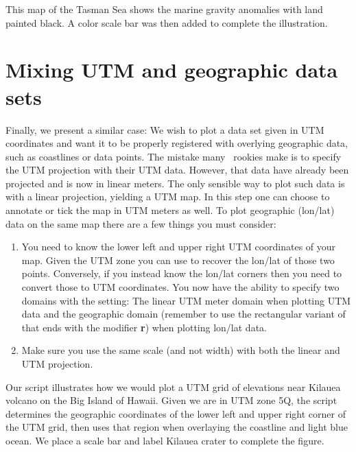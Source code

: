 
This map of the Tasman Sea shows the marine gravity anomalies with land painted black.  A color scale bar
was then added to complete the illustration.

 


\section{Mixing UTM and geographic data sets}

Finally, we present a similar case: We wish to plot a data set given in UTM coordinates and want it
to be properly registered with overlying geographic data, such as coastlines or data points.  The
mistake many \GMT\ rookies make is to specify the UTM projection with their UTM
data.  However, that data have already been projected and is now in linear meters.  The only
sensible way to plot such data is with a linear projection, yielding a UTM map.  In this step one can
choose to annotate or tick the map in UTM meters as well.  To plot geographic (lon/lat) data on
the same map there are a few things you must consider:
\begin{enumerate}
	\item You need to know the lower left and upper right UTM coordinates of your map. Given
	the UTM zone you can use  to recover the lon/lat of those two points.
	Conversely, if you instead know the lon/lat corners then you need to convert those
	to UTM coordinates.  You now have the ability to specify two domains with the  setting:
	The linear UTM meter domain when plotting UTM data and the geographic domain (remember to use the
	rectangular variant of  that ends with the modifier {\bf r}) when plotting lon/lat data.
	\item Make sure you use the same scale (and not width) with both the linear and UTM projection.
\end{enumerate}


Our script illustrates how we would plot a UTM grid of elevations near Kilauea volcano on the Big Island
of Hawaii.  Given we are in UTM zone 5Q, the script determines the geographic coordinates of the
lower left and upper right corner of the UTM grid, then uses that region when overlaying the coastline
and light blue ocean.  We place a scale bar and label Kilauea crater to complete the figure.

 
